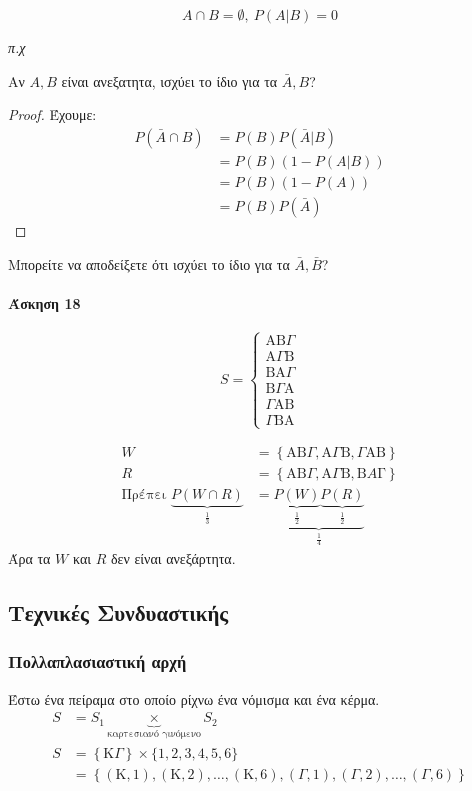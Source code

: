 \documentclass[11pt,a4paper,titlepage,draft]{article}
\begin{document}
\[A \cap B = \emptyset,\ P(A|B)=0\]

\textit{π.χ}

Αν \(A,B\) είναι ανεξατητα, ισχύει το ίδιο για τα \(\bar A,B\)?
\begin{proof}
Έχουμε:
\begin{align*}
P(\bar{A}\cap B)
&=
P(B)P(\bar A | B)
\\ &=
P(B) \left( 1 - P(A|B) \right)
\\ &=
P(B) \left( 1-P(A) \right)
\\ &=
P(B)P(\bar A)
\end{align*}
\end{proof}

Μπορείτε να αποδείξετε ότι ισχύει το ίδιο για τα \(\bar A, \bar B\)?

\paragraph{Άσκηση 18}
\[ S =
\begin{cases}
\mathrm A \mathrm B  \Gamma \\ \mathrm A  \Gamma \mathrm B \\\mathrm B \mathrm A  \Gamma \\\mathrm B  \Gamma \mathrm A \\ \Gamma \mathrm A \mathrm B \\ \Gamma \mathrm B \mathrm A
\end{cases}
\]

\begin{align*}
W &=  \left\lbrace \mathrm A \mathrm B \Gamma , \mathrm A  \Gamma \mathrm B,  \Gamma \mathrm A \mathrm B  \right\rbrace \\
R &=  \left\lbrace \mathrm{A} \mathrm{B} \Gamma , \mathrm A  \Gamma  \mathrm B, \mathrm B A \mathrm  \Gamma  \right\rbrace \\
\text{Πρέπει } \underbrace{P(W \cap R)}_\frac{1}{3} &=
\underbrace
{
\underbrace{P(W)}_\frac{1}{2}
\underbrace{P(R)}_\frac{1}{2}
}
_\frac{1}{4}
\end{align*}
Άρα τα \(W\) και \(R\) δεν είναι ανεξάρτητα.

\subsection{Τεχνικές Συνδυαστικής}

\subsubsection{Πολλαπλασιαστική αρχή}
Έστω ένα πείραμα στο οποίο ρίχνω ένα νόμισμα και ένα κέρμα.
\begin{align*}
S &= S_1 \underbrace{\times}_\text{καρτεσιανό γινόμενο} S_2 \\
S &=  \left\lbrace \mathrm K  \Gamma  \right\rbrace \times \lbrace 1,2,3,4,5,6 \rbrace \\
&=  \left\lbrace  \left( \mathrm K,1 \right), \left( \mathrm K,2 \right), \dots,  \left( \mathrm K,6  \right), \left(  \Gamma ,1 \right), \left(  \Gamma ,2 \right),\dots, \left(  \Gamma ,6 \right) \right\rbrace
\end{align*}
\end{document}
